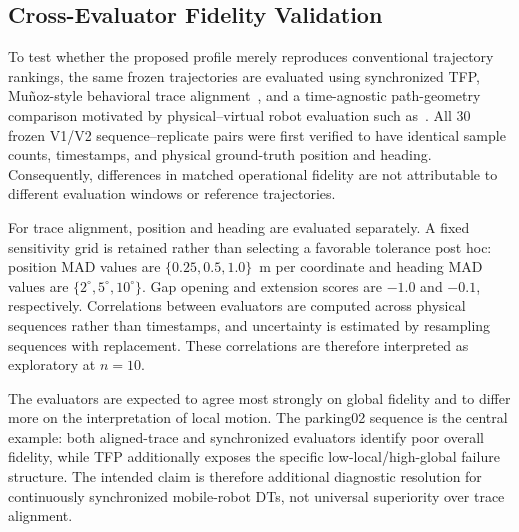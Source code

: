 \subsection{Cross-Evaluator Fidelity Validation}
\label{sec:cross_evaluator}
To test whether the proposed profile merely reproduces conventional trajectory
rankings, the same frozen trajectories are evaluated using synchronized TFP,
Mu\~noz-style behavioral trace alignment~\cite{munoz2024}, and a time-agnostic
path-geometry comparison motivated by physical--virtual robot evaluation such
as~\cite{bergs2025}. All 30 frozen V1/V2 sequence--replicate pairs were first
verified to have identical sample counts, timestamps, and physical
ground-truth position and heading. Consequently, differences in matched
operational fidelity are not attributable to different evaluation windows or
reference trajectories.

For trace alignment, position and heading are evaluated separately. A fixed
sensitivity grid is retained rather than selecting a favorable tolerance
post hoc: position MAD values are $\{0.25,0.5,1.0\}$~m per coordinate and
heading MAD values are $\{2^\circ,5^\circ,10^\circ\}$. Gap opening and
extension scores are $-1.0$ and $-0.1$, respectively. Correlations between
evaluators are computed across physical sequences rather than timestamps,
and uncertainty is estimated by resampling sequences with replacement.
These correlations are therefore interpreted as exploratory at $n=10$.

The evaluators are expected to agree most strongly on global fidelity and to
differ more on the interpretation of local motion. The parking02 sequence is
the central example: both aligned-trace and synchronized evaluators identify
poor overall fidelity, while TFP additionally exposes the specific
low-local/high-global failure structure. The intended claim is therefore
additional diagnostic resolution for continuously synchronized mobile-robot
DTs, not universal superiority over trace alignment.

